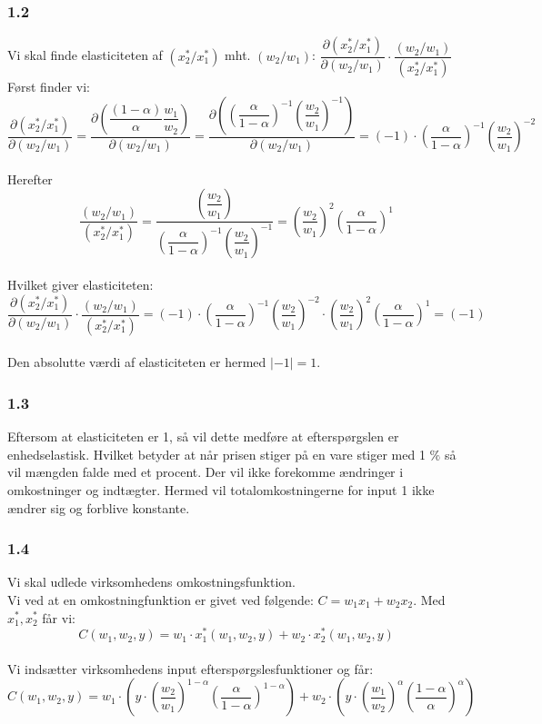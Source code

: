 \documentclass[a4paper, 12pt]{article}
\begin{document}
\subsubsection*{1.2}
Vi skal finde elasticiteten af $(x_{2}^{*} / x_{1}^{*})$ mht. $(w_{2} / w_{1})$: $\dfrac{\partial(x_{2}^{*} / x_{1}^{*})}{\partial(w_{2} / w_{1})} \cdot \dfrac{(w_{2}/w_{1})}{(x_{2}^{*} / x_{1}^{*})}$
\\
Først finder vi: 
$$\dfrac{\partial(x_{2}^{*} / x_{1}^{*})}{\partial(w_{2} / w_{1})} = \dfrac{\partial \left( \dfrac{(1- \alpha)}{\alpha} \dfrac{w_{1}}{w_{2}}\right)}{\partial(w_{2} / w_{1})} = \dfrac{\partial \left( \left( \dfrac{\alpha}{1 - \alpha} \right)^{-1} \left( \dfrac{w_{2}}{w_{1}} \right)^{-1} \right)}{\partial(w_{2} / w_{1})} = (-1) \cdot \left( \dfrac{\alpha}{1 - \alpha} \right)^{-1} \left( \dfrac{w_{2}}{w_{1}} \right)^{-2}$$
\\
Herefter
$$ \dfrac{(w_{2}/w_{1})}{(x_{2}^{*} / x_{1}^{*})} = \dfrac{\left( \dfrac{w_{2}}{w_{1}} \right)}{\left( \dfrac{\alpha}{1 - \alpha} \right)^{-1} \left( \dfrac{w_{2}}{w_{1}} \right)^{-1}} = \left( \dfrac{w_{2}}{w_{1}} \right)^{2} \left( \dfrac{\alpha}{1 - \alpha} \right)^{1} $$
\\
Hvilket giver elasticiteten:
$$\dfrac{\partial(x_{2}^{*} / x_{1}^{*})}{\partial(w_{2} / w_{1})} \cdot \dfrac{(w_{2}/w_{1})}{(x_{2}^{*} / x_{1}^{*})} = (-1) \cdot \left( \dfrac{\alpha}{1 - \alpha} \right)^{-1} \left( \dfrac{w_{2}}{w_{1}} \right)^{-2} \cdot \left( \dfrac{w_{2}}{w_{1}} \right)^{2} \left( \dfrac{\alpha}{1 - \alpha} \right)^{1} = (-1)$$
\\
Den absolutte værdi af elasticiteten er hermed $|-1| = 1$.

\subsubsection*{1.3}
Eftersom at elasticiteten er 1, så vil dette medføre at efterspørgslen er enhedselastisk. Hvilket betyder at når prisen stiger på en vare stiger med 1 $\%$ så vil mængden falde med et procent. Der vil ikke forekomme ændringer i omkostninger og indtægter. Hermed vil totalomkostningerne for input 1 ikke ændrer sig og forblive konstante.

\subsubsection*{1.4}
Vi skal udlede virksomhedens omkostningsfunktion.
\\
Vi ved at en omkostningfunktion er givet ved følgende: $C= w_{1}x_{1} + w_{2}x_{2}$. Med $x_{1}^{*},x_{2}^{*}$ får vi:
$$C(w_{1},w_{2},y) = w_{1} \cdot x_{1}^{*}(w_{1},w_{2},y) + w_{2} \cdot x_{2}^{*}(w_{1},w_{2},y)$$
\\
Vi indsætter virksomhedens input efterspørgslesfunktioner og får:
$$C(w_{1},w_{2},y) = w_{1} \cdot \left(  y \cdot  \left( \dfrac{w_{2}}{w_{1}} \right)^{1 - \alpha} \left( \dfrac{\alpha}{1 - \alpha} \right)^{1 - \alpha}  \right) + w_{2} \cdot \left(  y \cdot  \left( \dfrac{w_{1}}{w_{2}} \right)^{\alpha}  \left( \dfrac{1 - \alpha}{\alpha} \right)^{\alpha}  \right)$$
\end{document}
